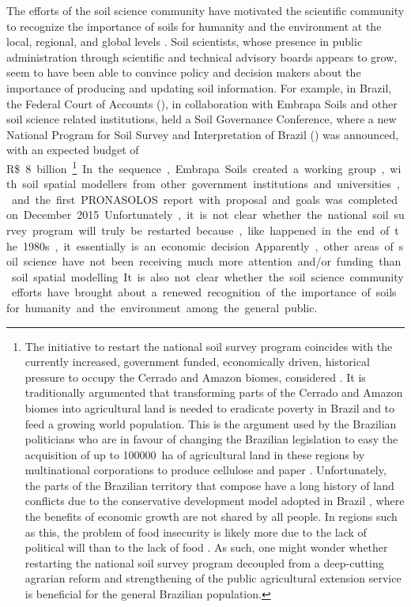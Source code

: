 \def\footpronassolos{\footnote{The initiative to restart the national soil survey program coincides with the 
currently increased, government funded, economically driven, historical pressure to occupy the Cerrado and 
Amazon biomes, considered \q{the last agricultural frontier} \cite{Correia2005, Macarini2005, Silva2005, 
CarvalhoEtAl2009, Batlle-BayerEtAl2010, MartinelliEtAl2010, SchneiderEtAl2015}. It is traditionally argumented 
that transforming parts of the Cerrado and Amazon biomes into agricultural land is needed to eradicate poverty 
in Brazil and to feed a growing world population. This is the argument used by the Brazilian politicians who 
are in favour of changing the Brazilian legislation to easy the acquisition of up to \SI{100000}{\hectare} of 
agricultural land in these regions by multinational corporations to produce cellulose and paper 
\cite{SECOM2015}. Unfortunately, the parts of the Brazilian territory that compose \q{the last agricultural 
frontier} have a long history of land conflicts due to the conservative development model adopted in Brazil 
\cite{ComissaoPastoraldaTerra2015, SchneiderEtAl2015, Fernandes2016}, where the benefits of economic growth 
are not shared by all people. In regions such as this, the problem of food insecurity is likely more due to 
the lack of political will than to the lack of food \cite{FAO2005, FAO2009, FAO2015}. As such, one might 
wonder whether restarting the national soil survey program decoupled from a deep-cutting agrarian reform and 
strengthening of the public agricultural extension service is beneficial for the general 
Brazilian population.}}

The efforts of the soil science community have motivated the scientific community to recognize the importance 
of soils for humanity and the environment at the local, regional, and global levels \cite{SanchezEtAl2009, 
Kempen2011, OmutoEtAl2013}. Soil scientists, whose presence in public administration through scientific and 
technical advisory boards appears to grow, seem to have been able to convince policy and decision makers about 
the importance of producing and updating soil information. For example, in Brazil, the Federal Court of 
Accounts (\tcu), in collaboration with Embrapa Soils and other soil science related institutions, held a Soil 
Governance Conference, where a new National Program for Soil Survey and Interpretation of Brazil (\pronassolos) 
was announced, with an expected budget of \SI{8}[R\$]~billion\footpronassolos. In the sequence, Embrapa Soils 
created a working group, with soil spatial modellers from other government institutions and universities, and 
the first PRONASOLOS report with proposal and goals was completed on December 2015. Unfortunately, it is not 
clear whether the national soil survey program will truly be restarted because, like happened in the end of the 
1980s, it essentially is an economic decision. Apparently, other areas of soil science have not been receiving 
much more attention and/or funding than soil spatial modelling. It is also not clear whether the soil science 
community efforts have brought about a renewed recognition of the importance of soils for humanity and the 
environment among the general public.

